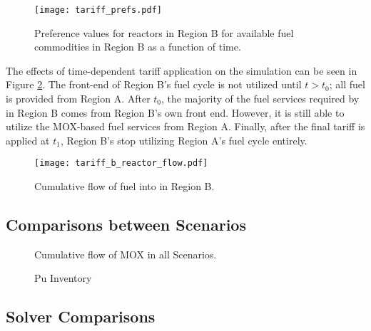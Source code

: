 \begin{figure}
  \begin{center}
    \texttt{[image: tariff\_prefs.pdf]}
    \caption[]{
      \label{fig:prefs}
      Preference values for reactors in Region B for available fuel commodities
      in Region B as a function of time.}
  \end{center}
\end{figure}

The effects of time-dependent tariff application on the simulation can be seen
in Figure \ref{fig:tariff}. The front-end of Region B's fuel cycle is not
utilized until $t > t_0$; all fuel is provided from Region A. After $t_0$, the
majority of the fuel services required by \reactors in Region B comes from
Region B's own front end. However, it is still able to utilize the MOX-based
fuel services from Region A. Finally, after the final tariff is applied at
$t_1$, Region B's \reactors stop utilizing Region A's fuel cycle entirely.    

\begin{figure}
  \begin{center}
    \texttt{[image: tariff\_b\_reactor\_flow.pdf]}
    \caption[]{
      \label{fig:tariff}
      Cumulative flow of fuel into \reactors in Region B.}
  \end{center}
\end{figure}

\subsection{Comparisons between Scenarios}

\begin{figure}
  \centering
  \begin{minipage}{\textwidth}
    \centering
  \end{minipage}%
  \caption[]{
    \label{fig:prefs}
    Cumulative flow of MOX in all Scenarios.}
\end{figure}

\begin{figure}
  \centering
  \begin{minipage}{0.5\columnwidth}
    \centering
    \vfill
  \end{minipage}%
  \begin{minipage}{0.5\columnwidth}
    \centering
    \vfill
  \end{minipage}
  \caption{Pu Inventory}\label{foo}
\end{figure}

\subsection{Solver Comparisons}

